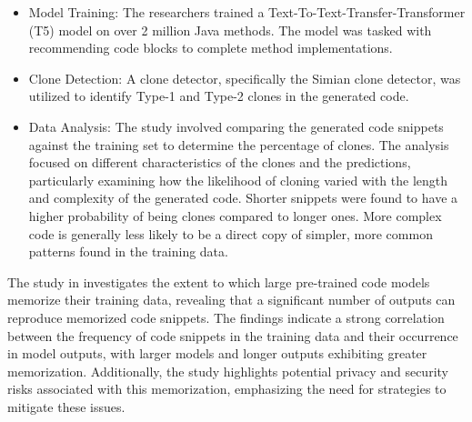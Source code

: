 \begin{tcolorbox}[title=Approach, colback=white, colframe=black, sharp corners=southwest, boxrule=0.8mm]
\begin{itemize}
\item Model Training: The researchers trained a Text-To-Text-Transfer-Transformer (T5) model on over 2 million Java methods. The model was tasked with recommending code blocks to complete method implementations.
\item Clone Detection: A clone detector, specifically the Simian clone detector, was utilized to identify Type-1 and Type-2 clones in the generated code. 
\item Data Analysis: The study involved comparing the generated code snippets against the training set to determine the percentage of clones. The analysis focused on different characteristics of the clones and the predictions, particularly examining how the likelihood of cloning varied with the length and complexity of the generated code. Shorter snippets were found to have a higher probability of being clones compared to longer ones. More complex code is generally less likely to be a direct copy of simpler, more common patterns found in the training data.

\end{itemize}
\end{tcolorbox}



The study in \cite{Yang:UnveilingMemorization:ICSE:2024} investigates the extent to which large pre-trained code models memorize their training data, revealing that a significant number of outputs can reproduce memorized code snippets. The findings indicate a strong correlation between the frequency of code snippets in the training data and their occurrence in model outputs, with larger models and longer outputs exhibiting greater memorization. Additionally, the study highlights potential privacy and security risks associated with this memorization, emphasizing the need for strategies to mitigate these issues.

